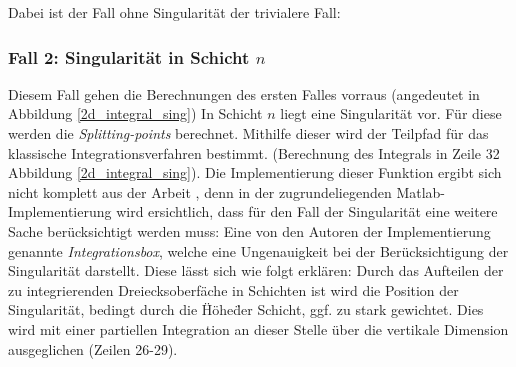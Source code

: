 Dabei ist der Fall ohne Singularität der trivialere Fall:

\begin{center}
    
    \label{2d_integral_trivial}
\end{center}


\subsubsection*{Fall 2: Singularität in Schicht $n$}

Diesem Fall gehen die Berechnungen des ersten Falles vorraus (angedeutet in Abbildung \ref{2d_integral_sing})
In Schicht $n$ liegt eine Singularität vor. Für diese werden die \textit{Splitting-points} berechnet. Mithilfe dieser wird der Teilpfad für das klassische Integrationsverfahren bestimmt.
(Berechnung des Integrals in Zeile 32 Abbildung \ref{2d_integral_sing}).
Die Implementierung dieser Funktion ergibt sich nicht komplett aus der Arbeit \cite{gasperini:hal-03209144}, denn in der zugrundeliegenden Matlab-Implementierung wird ersichtlich, dass für den Fall der Singularität 
eine weitere Sache berücksichtigt werden muss: Eine von den Autoren der Implementierung genannte \textit{Integrationsbox}, welche eine Ungenauigkeit bei der Berücksichtigung der Singularität darstellt.
Diese lässt sich wie folgt erklären: Durch das Aufteilen der zu integrierenden Dreiecksoberfäche in Schichten ist wird die Position der Singularität, bedingt durch die \"Höhe\" der Schicht, ggf. zu stark gewichtet.
Dies wird mit einer partiellen Integration an dieser Stelle über die vertikale Dimension ausgeglichen (Zeilen 26-29).

\begin{center}
    
    \label{2d_integral_sing}
\end{center}
